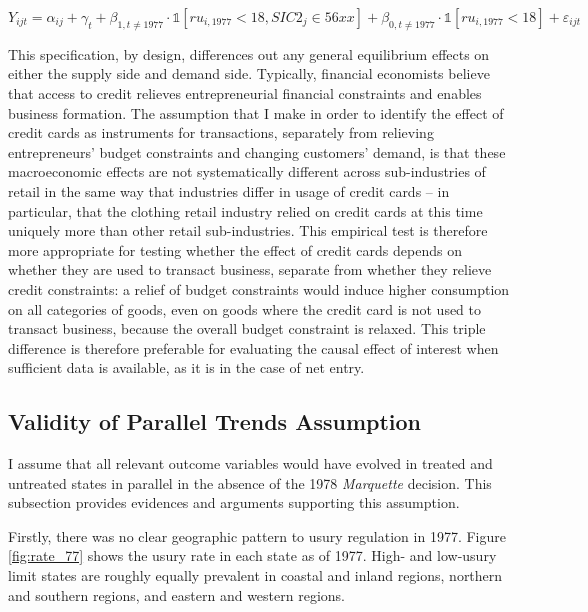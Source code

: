 \documentclass[12pt,english]{article}
\begin{document}
\begin{equation}\label{eq:triple_dif}
Y_{ijt}= \alpha_{ij} + \gamma_t + \beta_{1,t\ne 1977} \cdot \mathbb{1} \left[ ru_{i,1977} < 18, SIC2_j \in 56xx \right] + \beta_{0,t\ne 1977} \cdot \mathbb{1} \left[ ru_{i,1977} < 18 \right] +  \varepsilon_{ijt}
\end{equation}

This specification, by design, differences out any general equilibrium effects on either the supply side and demand side. Typically, financial economists believe that access to credit relieves entrepreneurial financial constraints and enables business formation. The assumption that I make in order to identify the effect of credit cards as instruments for transactions, separately from relieving entrepreneurs' budget constraints and changing customers' demand, is that these macroeconomic effects are not systematically different across sub-industries of retail in the same way that industries differ in usage of credit cards -- in particular, that the clothing retail industry relied on credit cards at this time uniquely more than other retail sub-industries. This empirical test is therefore more appropriate for testing whether the effect of credit cards depends on whether they are used to transact business, separate from whether they relieve credit constraints: a relief of budget constraints would induce higher consumption on all categories of goods, even on goods where the credit card is not used to transact business, because the overall budget constraint is relaxed. This triple difference is therefore preferable for evaluating the causal effect of interest when sufficient data is available, as it is in the case of net entry. 

\subsection{Validity of Parallel Trends Assumption}\label{subsec:validity}

I assume that all relevant outcome variables would have evolved in treated and untreated states in parallel in the absence of the 1978 \emph{Marquette} decision. This subsection provides evidences and arguments supporting this assumption. 

Firstly, there was no clear geographic pattern to usury regulation in 1977. Figure \ref{fig:rate_77} shows the usury rate in each state as of 1977. High- and low-usury limit states are roughly equally prevalent in coastal and inland regions, northern and southern regions, and eastern and western regions. 
\end{document}
